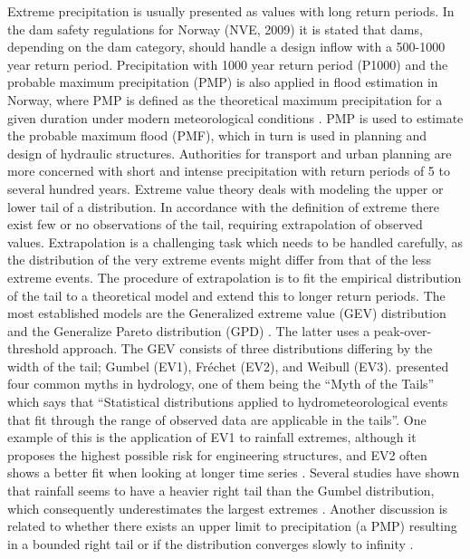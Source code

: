 \documentclass[12pt,a4paper,english]{article}
\begin{document}
Extreme precipitation is usually presented as values with long return periods. In the dam safety regulations for Norway (NVE, 2009) it is stated that dams, depending on the dam category, should handle a design inflow with a 500-1000 year return period. Precipitation with 1000 year return period (P1000) and the probable maximum precipitation (PMP) is also applied in flood estimation in Norway, where PMP is defined as the theoretical maximum precipitation for a given duration under modern meteorological conditions \citep{WMO2009a}. PMP is used to estimate the probable maximum flood (PMF), which in turn is used in planning and design of hydraulic structures. Authorities for transport and urban planning are more concerned with short and intense precipitation with return periods of 5 to several hundred years. Extreme value theory deals with modeling the upper or lower tail of a distribution. In accordance with the definition of extreme there exist few or no observations of the tail, requiring extrapolation of observed values. Extrapolation is a challenging task which needs to be handled carefully, as the distribution of the very extreme events might differ from that of the less extreme events. The procedure of extrapolation is to fit the empirical distribution of the tail to a theoretical model and extend this to longer return periods. The most established models are the Generalized extreme value (GEV) distribution and the Generalize Pareto distribution (GPD) \citep{Coles2001}. The latter uses a peak-over-threshold approach. The GEV consists of three distributions differing by the width of the tail; Gumbel (EV1), Fr\'echet (EV2), and Weibull (EV3). \cite{Willeke1980} presented four common myths in hydrology, one of them being the ``Myth of the Tails'' which says that ``Statistical distributions applied to hydrometeorological events that fit through the range of observed data are applicable in the tails''. One example of this is the application of EV1 to rainfall extremes, although it proposes the highest possible risk for engineering structures, and EV2 often shows a better fit when looking at longer time series \citep{KoutsoyiannisandBaloutsos2000,Koutsoyiannis2004a}. Several studies have shown that rainfall seems to have a heavier right tail than the Gumbel distribution, which consequently underestimates the largest extremes \citep{Wilks1993, KoutsoyiannisandBaloutsos2000, Colesetal2003, ColesandPericchi2003}. Another discussion is related to whether there exists an upper limit to precipitation (a PMP) resulting in a bounded right tail or if the distribution converges slowly to infinity \citep[e.g.][]{Koutsoyiannis2004a}.
\end{document}
